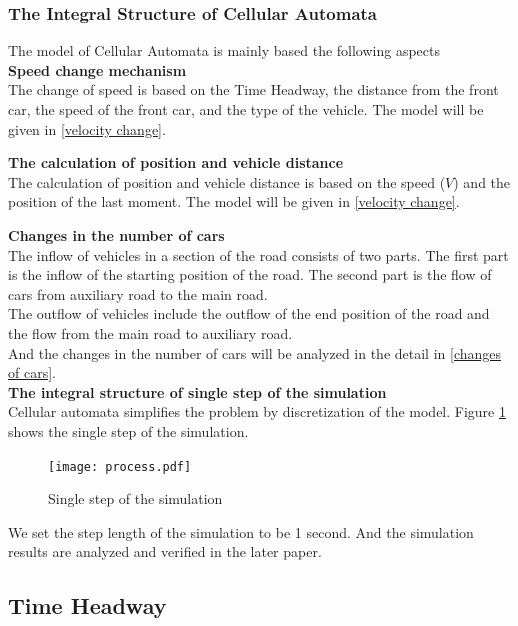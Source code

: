 \documentclass[UTF8]{mcmthesis}
\begin{document}
\subsubsection{The Integral Structure of Cellular Automata}
The model of Cellular Automata is mainly based the following aspects\\

\indent\textbf{Speed change mechanism\\}
\indent The change of speed is based on the Time Headway, the distance from the front car, the speed of the front car, and the type of the vehicle. The model will be given in \ref{velocity change}.

\indent\textbf{The calculation of position and vehicle distance\\}
\indent The calculation of position and vehicle distance is based on the speed ($V$) and the position of the last moment. The model will be given in \ref{velocity change}.

\indent\textbf{Changes in the number of cars\\}
\indent The inflow of vehicles in a section of the road consists of two parts. The first part is the inflow of the starting position of the road. The second part is the flow of cars from auxiliary road to the main road. \\
\indent The outflow of vehicles include the outflow of the end position of the road and the flow from the main road to auxiliary road.\\
\indent And the changes in the number of cars will be analyzed in the detail in \ref{changes of cars}.\\

\indent\textbf{The integral structure of single step of the simulation\\}
\indent Cellular automata simplifies the problem by discretization of the model. Figure \ref{process} shows the single step of the simulation.
\begin{figure}[H]	%
	\centerline{\texttt{[image: process.pdf]}}
	\caption{Single step of the simulation}
	\label{process}
\end{figure}
\indent We set the step length of the simulation to be 1 second. And the simulation results are analyzed and verified in the later paper.
\subsection{Time Headway}
\label{headway}
\end{document}

